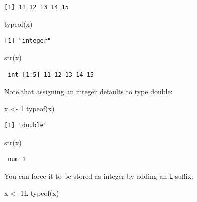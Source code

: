 \documentclass[
]{book}
\newenvironment{Shaded}{\begin{snugshade}}{\end{snugshade}}
\newcommand{\DecValTok}[1]{\textcolor[rgb]{0.00,0.00,0.81}{#1}}
\newcommand{\FunctionTok}[1]{\textcolor[rgb]{0.00,0.00,0.00}{#1}}
\newcommand{\NormalTok}[1]{#1}
\newcommand{\OtherTok}[1]{\textcolor[rgb]{0.56,0.35,0.01}{#1}}
\begin{document}
\begin{verbatim}
[1] 11 12 13 14 15
\end{verbatim}

\begin{Shaded}
\begin{Highlighting}[]
\FunctionTok{typeof}\NormalTok{(x)}
\end{Highlighting}
\end{Shaded}

\begin{verbatim}
[1] "integer"
\end{verbatim}

\begin{Shaded}
\begin{Highlighting}[]
\FunctionTok{str}\NormalTok{(x)}
\end{Highlighting}
\end{Shaded}

\begin{verbatim}
 int [1:5] 11 12 13 14 15
\end{verbatim}

Note that assigning an integer defaults to type double:

\begin{Shaded}
\begin{Highlighting}[]
\NormalTok{x }\OtherTok{\textless{}{-}} \DecValTok{1}
\FunctionTok{typeof}\NormalTok{(x)}
\end{Highlighting}
\end{Shaded}

\begin{verbatim}
[1] "double"
\end{verbatim}

\begin{Shaded}
\begin{Highlighting}[]
\FunctionTok{str}\NormalTok{(x)}
\end{Highlighting}
\end{Shaded}

\begin{verbatim}
 num 1
\end{verbatim}

You can force it to be stored as integer by adding an \texttt{L} suffix:

\begin{Shaded}
\begin{Highlighting}[]
\NormalTok{x }\OtherTok{\textless{}{-}}\NormalTok{ 1L}
\FunctionTok{typeof}\NormalTok{(x)}
\end{Highlighting}
\end{Shaded}
\end{document}
